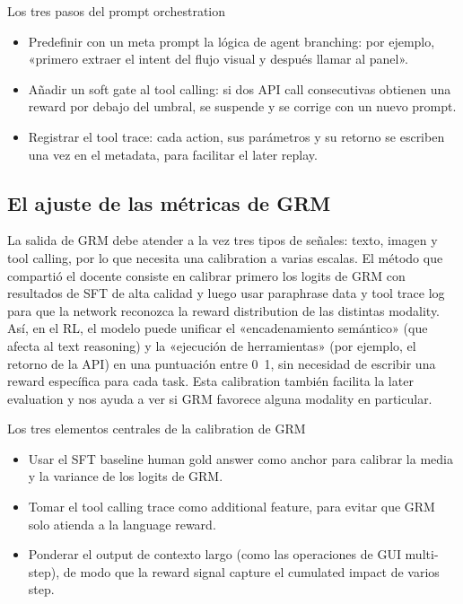 \begin{knowledgebox}{Los tres pasos del prompt orchestration}
\begin{itemize}
    \item Predefinir con un meta prompt la lógica de agent branching: por ejemplo, «primero extraer el intent del flujo visual y después llamar al panel».
    \item Añadir un soft gate al tool calling: si dos API call consecutivas obtienen una reward por debajo del umbral, se suspende y se corrige con un nuevo prompt.
    \item Registrar el tool trace: cada action, sus parámetros y su retorno se escriben una vez en el metadata, para facilitar el later replay.
\end{itemize}
\end{knowledgebox}

\subsection{El ajuste de las métricas de GRM}
La salida de GRM debe atender a la vez tres tipos de señales: texto, imagen y tool calling, por lo que necesita una calibration a varias escalas. El método que compartió el docente consiste en calibrar primero los logits de GRM con resultados de SFT de alta calidad y luego usar paraphrase data y tool trace log para que la network reconozca la reward distribution de las distintas modality. Así, en el RL, el modelo puede unificar el «encadenamiento semántico» (que afecta al text reasoning) y la «ejecución de herramientas» (por ejemplo, el retorno de la API) en una puntuación entre 0~1, sin necesidad de escribir una reward específica para cada task. Esta calibration también facilita la later evaluation y nos ayuda a ver si GRM favorece alguna modality en particular.

\begin{knowledgebox}{Los tres elementos centrales de la calibration de GRM}
\begin{itemize}
    \item Usar el SFT baseline human gold answer como anchor para calibrar la media y la variance de los logits de GRM.
    \item Tomar el tool calling trace como additional feature, para evitar que GRM solo atienda a la language reward.
    \item Ponderar el output de contexto largo (como las operaciones de GUI multi-step), de modo que la reward signal capture el cumulated impact de varios step.
\end{itemize}
\end{knowledgebox}

